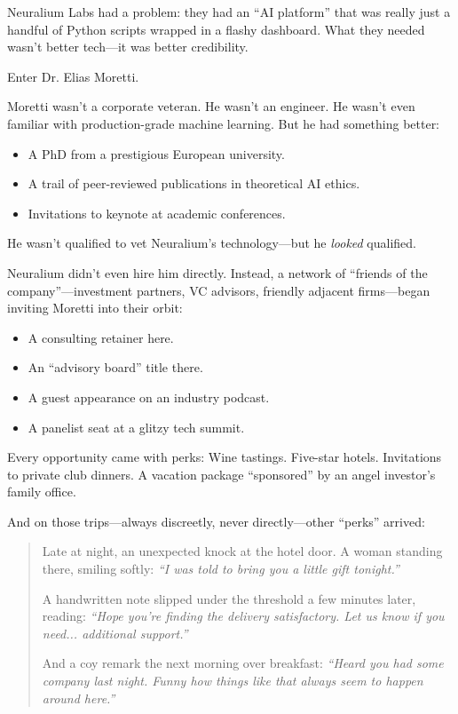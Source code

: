 Neuralium Labs had a problem: they had an “AI platform” that was really just a handful of Python scripts wrapped in a flashy dashboard. What they needed wasn’t better tech—it was better credibility.

Enter Dr. Elias Moretti.

Moretti wasn’t a corporate veteran. He wasn’t an engineer. He wasn’t even familiar with production-grade machine learning.  
But he had something better:  
\begin{itemize}
  \item A PhD from a prestigious European university.
  \item A trail of peer-reviewed publications in theoretical AI ethics.
  \item Invitations to keynote at academic conferences.
\end{itemize}

He wasn’t qualified to vet Neuralium’s technology—but he \textit{looked} qualified.

Neuralium didn’t even hire him directly. Instead, a network of “friends of the company”—investment partners, VC advisors, friendly adjacent firms—began inviting Moretti into their orbit:
\begin{itemize}
  \item A consulting retainer here.
  \item An “advisory board” title there.
  \item A guest appearance on an industry podcast.
  \item A panelist seat at a glitzy tech summit.
\end{itemize}

Every opportunity came with perks:  
Wine tastings. Five-star hotels. Invitations to private club dinners. A vacation package “sponsored” by an angel investor’s family office.

And on those trips—always discreetly, never directly—other “perks” arrived:
\begin{quote}
Late at night, an unexpected knock at the hotel door.  
A woman standing there, smiling softly:  \textit{“I was told to bring you a little gift tonight.”}

A handwritten note slipped under the threshold a few minutes later, reading:  
\textit{“Hope you’re finding the delivery satisfactory. Let us know if you need... additional support.”}

And a coy remark the next morning over breakfast:  
\textit{“Heard you had some company last night. Funny how things like that always seem to happen around here.”}
\end{quote}



